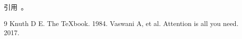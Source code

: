 \documentclass{article}
\begin{document}
引用~\cite{knuth1984}。
\begin{thebibliography}{9}
 Knuth D E. The \TeX book. 1984.
 Vaswani A, et al. Attention is all you need. 2017.
\end{thebibliography}
\end{document}
